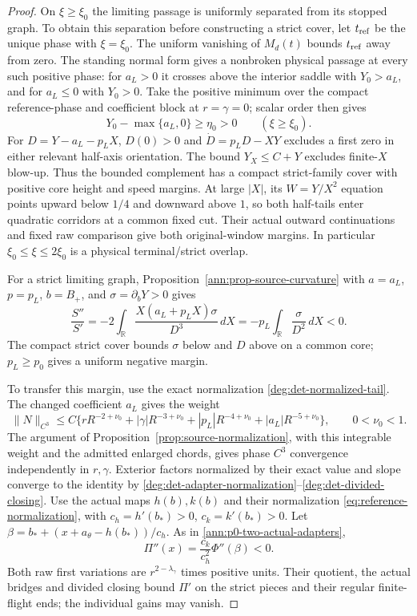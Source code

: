 \begin{proof}
On \(\xi\ge\xi_0\) the limiting passage is uniformly separated from
its stopped graph. To obtain this separation before constructing a strict
cover, let \(t_{\rm ref}\) be the unique phase with \(\xi=\xi_0\).
The uniform vanishing of \(M_d(t)\) bounds \(t_{\rm ref}\) away from
zero. The standing normal form gives a nonbroken physical passage at
every such positive phase: for \(a_L>0\) it crosses above the interior
saddle with \(Y_0>a_L\), and for \(a_L\le0\) with \(Y_0>0\).
Take the positive minimum over the compact reference-phase and
coefficient block at \(r=\gamma=0\); scalar order then gives
\[
 Y_0-\max\{a_L,0\}\ge\eta_0>0\qquad(\xi\ge\xi_0).
\]
For \(D=Y-a_L-p_LX\), \(D(0)>0\) and
\(\dot D=p_LD-XY\) excludes a first zero in either relevant half-axis
orientation. The bound \(Y_X\le C+Y\) excludes finite-\(X\) blow-up.
Thus the bounded complement has a compact strict-family cover with
positive core height and speed margins. At large \(|X|\), its
\(W=Y/X^2\) equation points upward below \(1/4\) and downward above
\(1\), so both half-tails enter quadratic corridors at a common fixed
cut. Their actual outward continuations and fixed raw comparison give
both original-window margins. In particular
\(\xi_0\le\xi\le2\xi_0\) is a physical terminal/strict overlap.

For a strict limiting graph, Proposition~\ref{ann:prop-source-curvature}
with \(a=a_L\), \(p=p_L\), \(b=B_+\), and
\(\sigma=\partial_bY>0\) gives
\begin{equation}\label{deg:trace-strict-curvature}
 \frac{S''}{S'}=-2\int_{\mathbb R}\frac{X(a_L+p_LX)\sigma}{D^3}\,dX
              =-p_L\int_{\mathbb R}\frac{\sigma}{D^2}\,dX<0.
\end{equation}
The compact strict cover bounds \(\sigma\) below and \(D\) above
on a common core; \(p_L\ge p_0\) gives a uniform negative margin.

To transfer this margin, use the exact normalization
\eqref{deg:det-normalized-tail}. The changed coefficient \(a_L\)
gives the weight
\[
 \|N\|_{C^3}\le C\{rR^{-2+\nu_0}+|\gamma|R^{-3+\nu_0}
                  +|p_L|R^{-4+\nu_0}+|a_L|R^{-5+\nu_0}\},
 \qquad 0<\nu_0<1.
\]
The argument of Proposition~\ref{prop:source-normalization}, with this
integrable weight and the admitted enlarged chords, gives phase \(C^3\)
convergence independently in \(r,\gamma\). Exterior factors normalized
by their exact value and slope converge to the identity by
\eqref{deg:det-adapter-normalization}--\eqref{deg:det-divided-closing}.
Use the actual maps \(h(b),k(b)\) and their normalization
\eqref{eq:reference-normalization}, with
\(c_h=h'(b_*)>0\), \(c_k=k'(b_*)>0\). Let
\(\beta=b_*+(x+a_\theta-h(b_*))/c_h\). As in
\eqref{ann:p0-two-actual-adapters},
\begin{equation}\label{deg:trace-physical-curvature}
 \Pi''(x)=\frac{c_k}{c_h^2}\Phi''(\beta)<0.
\end{equation}
Both raw first variations are \(r^{2-\lambda_\gamma}\) times
positive units. Their quotient, the actual bridges and divided closing
bound \(\Pi'\) on the strict pieces and their regular finite-flight
ends; the individual gains may vanish.


\end{proof}
